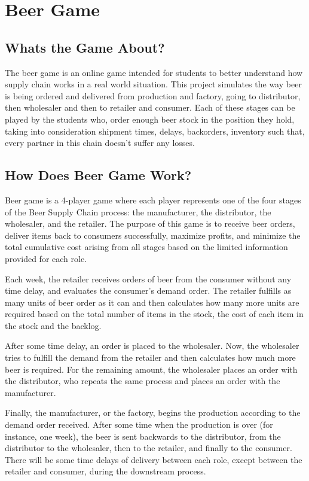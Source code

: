 \hypertarget{index_intro_sec}{}\section{Beer Game}\label{index_intro_sec}
\hypertarget{index_intro}{}\subsection{What\textquotesingle{}s the Game About?}\label{index_intro}
The beer game is an online game intended for students to better understand how supply chain works in a real world situation. This project simulates the way beer is being ordered and delivered from production and factory, going to distributor, then wholesaler and then to retailer and consumer. Each of these stages can be played by the students who, order enough beer stock in the position they hold, taking into consideration shipment times, delays, backorders, inventory such that, every partner in this chain doesn’t suffer any losses.\hypertarget{index_info}{}\subsection{How Does Beer Game Work?}\label{index_info}
Beer game is a 4-\/player game where each player represents one of the four stages of the Beer Supply Chain process\+: the manufacturer, the distributor, the wholesaler, and the retailer. The purpose of this game is to receive beer orders, deliver items back to consumers successfully, maximize profits, and minimize the total cumulative cost arising from all stages based on the limited information provided for each role.

Each week, the retailer receives orders of beer from the consumer without any time delay, and evaluates the consumer’s demand order. The retailer fulfills as many units of beer order as it can and then calculates how many more units are required based on the total number of items in the stock, the cost of each item in the stock and the backlog.

After some time delay, an order is placed to the wholesaler. Now, the wholesaler tries to fulfill the demand from the retailer and then calculates how much more beer is required. For the remaining amount, the wholesaler places an order with the distributor, who repeats the same process and places an order with the manufacturer.

Finally, the manufacturer, or the factory, begins the production according to the demand order received. After some time when the production is over (for instance, one week), the beer is sent backwards to the distributor, from the distributor to the wholesaler, then to the retailer, and finally to the consumer. There will be some time delays of delivery between each role, except between the retailer and consumer, during the downstream process. 